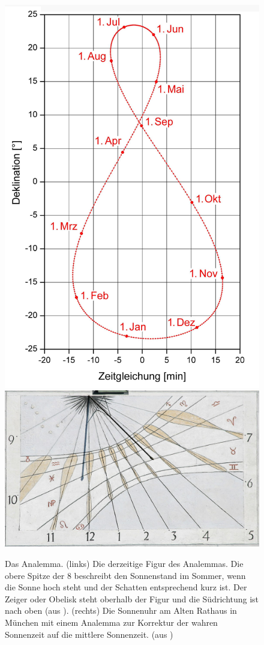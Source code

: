 \begin{figure}[htb]
\includegraphics[scale=0.28]{./Bilder/Analemma.jpg} 
\hfill
\includegraphics[scale=0.24]{./Bilder/Munich_Altes_Rathaus_Sundial.jpg}
\caption{\label{fig_Analemma}%
Das Analemma. (links) Die derzeitige Figur des Analemmas. Die obere Spitze der 8
beschreibt den Sonnenstand im Sommer, wenn die Sonne hoch steht und der Schatten
entsprechend kurz ist. Der Zeiger oder Obelisk steht oberhalb der Figur und die S\"udrichtung
ist nach oben (aus \cite{Wikipedia_Analemma}). (rechts) Die Sonnenuhr am Alten Rathaus in M\"unchen
mit einem Analemma zur 
Korrektur der wahren Sonnenzeit auf die mittlere Sonnenzeit. (aus \cite{Niermann})} 
\end{figure}

